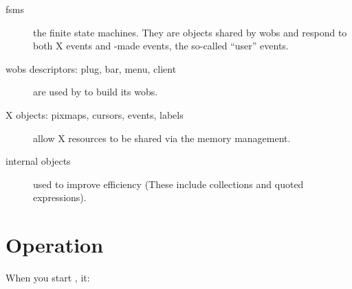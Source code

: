 \begin{description}
\item[fsms] the finite state machines. They are {\WOOL} objects shared by
wobs and respond to both X events and {\WOOL}-made events, the so-called
``user'' events.

\item[wobs descriptors: plug, bar, menu, client] are used by {\GWM} to build
its wobs.

\item[X objects: pixmaps, cursors, events, labels] allow X
resources to be shared via the {\WOOL} memory management.

\item[internal objects] used to improve efficiency (These include
collections and quoted expressions).

\end{description}

\section{Operation}

When you start {\GWM}, it:

